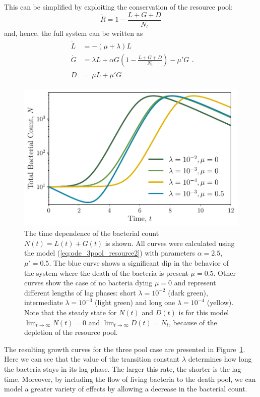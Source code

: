 \documentclass[10pt,A4paper]{article}
\numberwithin{equation}{section}
\begin{document}
%
This can be simplified by exploiting the conservation of the resource pool:
\begin{equation}
    \tilde{R} = 1 - \frac{L+G+D}{N_t}
\end{equation}
and, hence, the full system can be written as
\begin{align}
    \begin{split}
        \dot{L} &= -(\mu + \lambda) L\\
        \dot{G} &= \lambda L + \alpha G\left(1-\frac{L+G+D}{N_t}\right)-\mu' G\\
        \dot{D} &= \mu  L + \mu' G
    \end{split}.
\label{eq:ode_3pool_resource2}
\end{align}
%
%
\begin{figure}
    \begin{center}
    \includegraphics[width=0.9\columnwidth]{Figures/pool_model_3pools_resource.pdf}
    \caption{
        The time dependence of the bacterial count $N(t) = L(t) + G(t) $ is shown.
        All curves were calculated using the model (\ref{eq:ode_3pool_resource2}) with parameters $\alpha=2.5$, $\mu'=0.5$.
        The blue curve shows a significant dip in the behavior of the system where the death of the bacteria is present $\mu = 0.5$.
        Other curves show the case of no bacteria dying $\mu=0$ and represent different lengths of lag phases: short $\lambda=10^{-2}$ (dark green), intermediate $\lambda=10^{-3}$ (light green) and long one $\lambda=10^{-4}$ (yellow). Note that the steady state for $N(t)$ and $D(t)$ is for this model $\lim_{t\to\infty} N(t)=0$ and $\lim_{t\to\infty} D(t)=N_t$, because of the depletion of the resource pool. 
    }
    \label{fig:3pool_resource_plots}
    \end{center}
\end{figure}
The resulting growth curves for the three pool case are presented in Figure~\ref{fig:3pool_resource_plots}.
Here we can see that the value of the transition constant $\lambda$ determines how long the bacteria stays in its lag-phase.
The larger this rate, the shorter is the lag-time.
Moreover, by including the flow of living bacteria to the death pool, we can model a greater variety of effects by allowing a decrease in the bacterial count.
%
%
\end{document}
